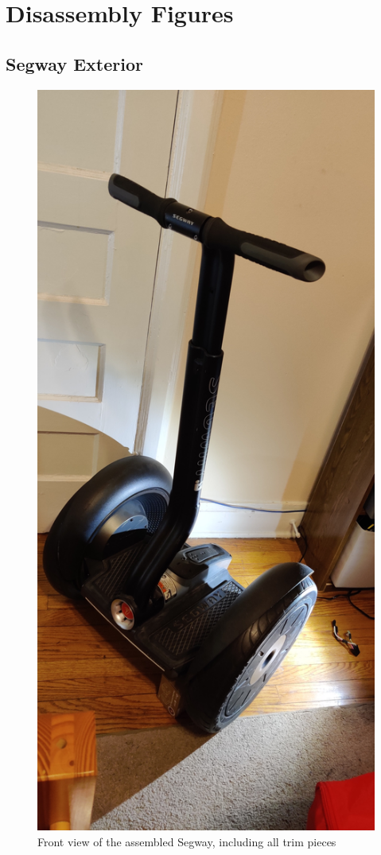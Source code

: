 \documentclass[]{formalLabReport}
\begin{document}
\section{Disassembly Figures}

\subsection{Segway Exterior}

\begin{figure}
    \includegraphics[angle=-90]{segwayFront.jpg}
    \caption{Front view of the assembled Segway, including all trim pieces}
    \label{fig:segwayFront.jpg}
\end{figure}
\end{document}
